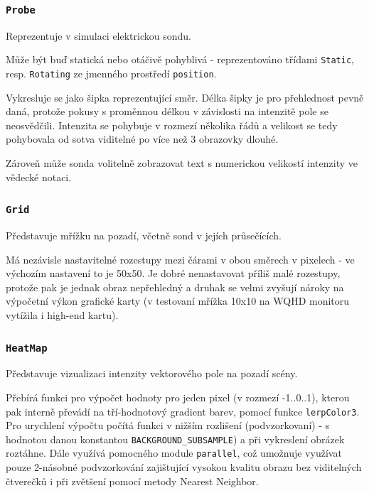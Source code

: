 \documentclass[12pt,a4paper]{article}
\newcommand{\code}[1]{\texttt{#1}}
\begin{document}
\subsubsection{\code{Probe}}

Reprezentuje v simulaci elektrickou sondu.

Může být buď statická nebo otáčivě pohyblivá - reprezentováno třídami
\code{Static}, resp. \code{Rotating} ze jmenného prostředí \code{position}.

Vykresluje se jako šipka reprezentující směr. Délka šipky je pro přehlednost
pevně daná, protože pokusy s proměnnou délkou v závislosti na intenzitě pole se
neosvědčili. Intenzita se pohybuje v rozmezí několika řádů a velikost se tedy
pohybovala od sotva viditelné po více než 3 obrazovky dlouhé.

Zároveň může sonda volitelně zobrazovat text s numerickou velikostí intenzity ve
vědecké notaci.

\subsubsection{\code{Grid}}

Představuje mřížku na pozadí, včetně sond v jejích průsečících.

Má nezávisle nastavitelné rozestupy mezi čárami v obou směrech v pixelech - ve
výchozím nastavení to je 50x50. Je dobré nenastavovat příliš malé rozestupy,
protože pak je jednak obraz nepřehledný a druhak se velmi zvyšují nároky na
výpočetní výkon grafické karty (v testovaní mřížka 10x10 na WQHD monitoru
vytížila i high-end kartu).

\subsubsection{\code{HeatMap}}

Představuje vizualizaci intenzity vektorového pole na pozadí scény.

Přebírá funkci pro výpočet hodnoty pro jeden pixel (v rozmezí -1..0..1), kterou
pak interně převádí na tří-hodnotový gradient barev, pomocí funkce
\code{lerpColor3}. Pro urychlení výpočtu počítá funkci v nižším rozlišení
(podvzorkovaní) - s hodnotou danou konstantou \code{BACKGROUND\_SUBSAMPLE}) a
při vykreslení obrázek roztáhne. Dále využívá pomocného module \code{parallel},
což umožnuje využívat pouze 2-násobné podvzorkování zajištující vysokou kvalitu
obrazu bez viditelných čtverečků i při zvětšení pomocí metody Nearest Neighbor.
\end{document}
